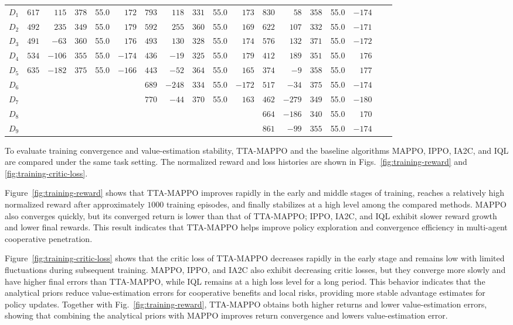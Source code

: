 \documentclass{cja}
\begin{document}
\begin{table}[!t]
{\begin{tabular}{@{}c rrrrr rrrrr rrrrr cc@{}}
$D_1$ & $617$ & $115$ & $378$ & 55.0 & $172$ & $793$ & $118$ & $331$ & 55.0 & $173$ & $830$ & $58$ & $358$ & 55.0 & $-174$ &&\\
$D_2$ & $492$ & $235$ & $349$ & 55.0 & $179$ & $592$ & $255$ & $360$ & 55.0 & $169$ & $622$ & $107$ & $332$ & 55.0 & $-171$ &&\\
$D_3$ & $491$ & $-63$ & $360$ & 55.0 & $176$ & $493$ & $130$ & $328$ & 55.0 & $174$ & $576$ & $132$ & $371$ & 55.0 & $-172$ &&\\
$D_4$ & $534$ & $-106$ & $355$ & 55.0 & $-174$ & $436$ & $-19$ & $325$ & 55.0 & $179$ & $412$ & $189$ & $351$ & 55.0 & $176$ &&\\
$D_5$ & $635$ & $-182$ & $375$ & 55.0 & $-166$ & $443$ & $-52$ & $364$ & 55.0 & $165$ & $374$ & $-9$ & $358$ & 55.0 & $177$ &&\\
$D_6$ & & & & & & $689$ & $-248$ & $334$ & 55.0 & $-172$ & $517$ & $-34$ & $375$ & 55.0 & $-174$ &&\\
$D_7$ & & & & & & $770$ & $-44$ & $370$ & 55.0 & $163$ & $462$ & $-279$ & $349$ & 55.0 & $-180$ &&\\
$D_8$ & & & & & & & & & & & $664$ & $-186$ & $340$ & 55.0 & $170$ &&\\
$D_9$ & & & & & & & & & & & $861$ & $-99$ & $355$ & 55.0 & $-174$ &&\\
\bottomrule
\end{tabular}%
}
\end{table}

To evaluate training convergence and value-estimation stability, TTA-MAPPO and the baseline algorithms MAPPO, IPPO, IA2C, and IQL are compared under the same task setting. The normalized reward and loss histories are shown in Figs.~\ref{fig:training-reward} and \ref{fig:training-critic-loss}.

Figure~\ref{fig:training-reward} shows that TTA-MAPPO improves rapidly in the early and middle stages of training, reaches a relatively high normalized reward after approximately $1000$ training episodes, and finally stabilizes at a high level among the compared methods. MAPPO also converges quickly, but its converged return is lower than that of TTA-MAPPO; IPPO, IA2C, and IQL exhibit slower reward growth and lower final rewards. This result indicates that TTA-MAPPO helps improve policy exploration and convergence efficiency in multi-agent cooperative penetration.

Figure~\ref{fig:training-critic-loss} shows that the critic loss of TTA-MAPPO decreases rapidly in the early stage and remains low with limited fluctuations during subsequent training. MAPPO, IPPO, and IA2C also exhibit decreasing critic losses, but they converge more slowly and have higher final errors than TTA-MAPPO, while IQL remains at a high loss level for a long period. This behavior indicates that the analytical priors reduce value-estimation errors for cooperative benefits and local risks, providing more stable advantage estimates for policy updates. Together with Fig.~\ref{fig:training-reward}, TTA-MAPPO obtains both higher returns and lower value-estimation errors, showing that combining the analytical priors with MAPPO improves return convergence and lowers value-estimation error.
\end{document}
